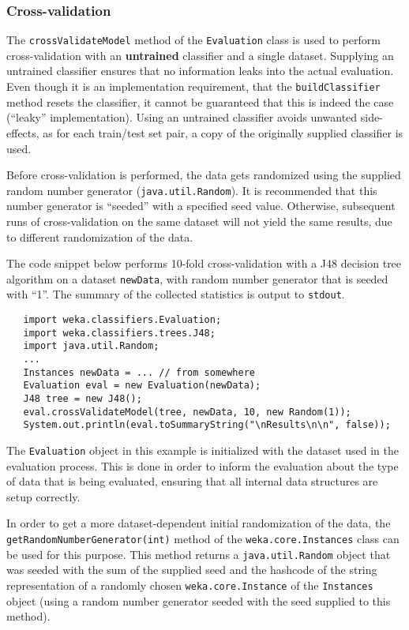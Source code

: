 \subsubsection*{Cross-validation}
The \texttt{crossValidateModel} method of the \texttt{Evaluation} class is used
to perform cross-validation with an \textbf{untrained} classifier and a single
dataset. Supplying an untrained classifier ensures that no information leaks
into the actual evaluation. Even though it is an implementation requirement,
that the \texttt{buildClassifier} method resets the classifier, it cannot be
guaranteed that this is indeed the case (``leaky'' implementation). Using an
untrained classifier avoids unwanted side-effects, as for each train/test set
pair, a copy of the originally supplied classifier is used.

Before cross-validation is performed, the data gets randomized using the
supplied random number generator (\texttt{java.util.Random}). It is
recommended that this number generator is ``seeded'' with a specified seed
value. Otherwise, subsequent runs of cross-validation on the same dataset will
not yield the same results, due to different randomization of the data.

The code snippet below performs 10-fold cross-validation with a J48 decision
tree algorithm on a dataset \texttt{newData}, with random number generator that
is seeded with ``1''. The summary of the collected statistics is output to
\texttt{stdout}.
\begin{verbatim}
   import weka.classifiers.Evaluation;
   import weka.classifiers.trees.J48;
   import java.util.Random;
   ...
   Instances newData = ... // from somewhere
   Evaluation eval = new Evaluation(newData);
   J48 tree = new J48();
   eval.crossValidateModel(tree, newData, 10, new Random(1));
   System.out.println(eval.toSummaryString("\nResults\n\n", false));
\end{verbatim}
The \texttt{Evaluation} object in this example is initialized with the dataset
used in the evaluation process. This is done in order to inform the evaluation
about the type of data that is being evaluated, ensuring that all internal data
structures are setup correctly.

In order to get a more dataset-dependent initial randomization of the data, the
\texttt{getRandomNumberGenerator(int)} method of the
\texttt{weka.core.Instances} class can be used for this purpose. This method
returns a \texttt{java.util.Random} object that was seeded with the sum
of the supplied seed and the hashcode of the string representation of
a randomly chosen \texttt{weka.core.Instance} of the \texttt{Instances} object
(using a random number generator seeded with the seed supplied to this method).

